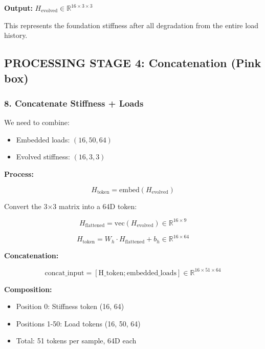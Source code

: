 \documentclass[11pt,a4paper]{article}
\begin{document}
\textbf{Output:} $H_{\text{evolved}} \in \mathbb{R}^{16 \times 3 \times 3}$

This represents the foundation stiffness after all degradation from the entire load history.

\subsection{PROCESSING STAGE 4: Concatenation (Pink box)}

\subsubsection{8. Concatenate Stiffness + Loads}

We need to combine:
\begin{itemize}
  \item Embedded loads: $(16, 50, 64)$
  \item Evolved stiffness: $(16, 3, 3)$
\end{itemize}

\textbf{Process:}

\begin{equation}
H_{\text{token}} = \text{embed}(H_{\text{evolved}})
\end{equation}

Convert the 3×3 matrix into a 64D token:

\begin{equation}
H_{\text{flattened}} = \text{vec}(H_{\text{evolved}}) \in \mathbb{R}^{16 \times 9}
\end{equation}

\begin{equation}
H_{\text{token}} = W_{h} \cdot H_{\text{flattened}} + b_h \in \mathbb{R}^{16 \times 64}
\end{equation}

\textbf{Concatenation:}

\begin{equation}
\text{concat\_input} = [\text{H\_token}; \text{embedded\_loads}] \in \mathbb{R}^{16 \times 51 \times 64}
\end{equation}

\textbf{Composition:}
\begin{itemize}
  \item Position 0: Stiffness token (16, 64)
  \item Positions 1-50: Load tokens (16, 50, 64)
  \item Total: 51 tokens per sample, 64D each
\end{itemize}
\end{document}
